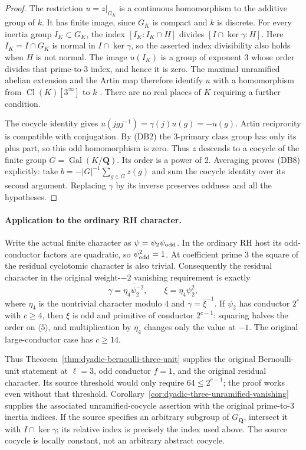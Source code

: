 \begin{proof}
The restriction $u=z|_{G_K}$ is a continuous homomorphism to
the additive group of $k$.  It has finite image, since $G_K$
is compact and $k$ is discrete.  For every inertia group
$I_K\subset G_K$, the index
$[I_K:I_K\cap H]$ divides $[I\cap\ker\gamma:H]$.
Here $I_K=I\cap G_K$ is normal in $I\cap\ker\gamma$, so
the asserted index divisibility also holds when $H$ is not normal.
The image $u(I_K)$ is a group of exponent $3$ whose order
divides that prime-to-$3$ index, and hence it is zero.
The maximal unramified abelian extension and the Artin map
therefore identify $u$ with a homomorphism from
$\operatorname{Cl}(K)[3^\infty]$ to $k$
\cite[Chapter V, Example 3.9]{dyadic-bernoulli-milne}.
There are no real places of $K$ requiring a further condition.

The cocycle identity gives
$u(jgj^{-1})=\gamma(j)u(g)=-u(g)$.
Artin reciprocity is compatible with conjugation.
By (DB2) the $3$-primary class group has only its plus part,
so this odd homomorphism is zero.  Thus $z$ descends to a
cocycle of the finite group $G=\operatorname{Gal}(K/\mathbf Q)$.
Its order is a power of $2$.  Averaging proves (DB8) explicitly:
take $b=-|G|^{-1}\sum_{g\in G}z(g)$ and sum the cocycle
identity over its second argument.  Replacing $\gamma$
by its inverse preserves oddness and all the hypotheses.
\end{proof}

\paragraph{Application to the ordinary RH character.}
Write the actual finite character as $\psi=\psi_2\psi_{\rm odd}$.
In the ordinary RH host its odd-conductor factors are quadratic,
so $\psi_{\rm odd}^2=1$.  At coefficient prime $3$ the square
of the residual cyclotomic character is also trivial.
Consequently the residual character in the original weight-$-2$
vanishing requirement is exactly
\[
              \gamma=\overline{\eta_4\psi_2^{-2}},
              \qquad \xi=\eta_4\psi_2^2,                    \tag{DB9}
\]
where $\eta_4$ is the nontrivial character modulo $4$ and
$\gamma=\bar\xi^{-1}$.  If $\psi_2$ has conductor $2^c$
with $c\ge4$, then $\xi$ is odd and primitive of conductor
$2^{c-1}$: squaring halves the order on $\langle5\rangle$,
and multiplication by $\eta_4$ changes only the value at $-1$.
The original large-conductor case has $c\ge14$.

Thus Theorem~\ref{thm:dyadic-bernoulli-three-unit} supplies the
original Bernoulli-unit statement at $\ell=3$, odd conductor
$f=1$, and the original residual character.  Its source threshold
would only require $64\le2^{c-1}$; the proof works even without
that threshold.  Corollary~\ref{cor:dyadic-three-unramified-vanishing}
supplies the associated unramified-cocycle assertion with the
original prime-to-$3$ inertia indices.  If the source specifies
an arbitrary subgroup of $G_{\mathbf Q}$, intersect it with
$I\cap\ker\gamma$; its relative index is precisely the index
used above.  The source cocycle is locally constant, not an
arbitrary abstract cocycle\cite{dyadic-bernoulli-source}.

